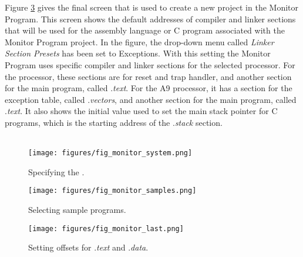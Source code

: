 Figure \ref{fig:monitor_last} gives the final screen that is 
used to create a new project in the Monitor Program. This screen shows the default addresses of 
compiler and linker sections that will be used for the assembly language or C program 
associated with the Monitor Program project.  In the figure, the drop-down menu called 
{\it Linker Section Presets} has been set to {\sf Exceptions}. With this setting the 
Monitor Program uses specific compiler and linker sections for the selected processor.
For the \processor processor, these sections are for reset and
trap handler, and another section for the main program, called .{\it text}. For the
A9 processor, it has a section for the exception table, 
called .{\it vectors}, and another section
for the main program, called .{\it text}. It also shows the initial value used to set the main 
stack pointer for C programs, which is the starting address of the .{\it stack} section.
~\\
~\\
\begin{figure}[h!]
	\centering
	\texttt{[image: figures/fig\_monitor\_system.png]}
	\caption{Specifying the {\systemNameFull}.}
	\label{fig:monitor_system}
\end{figure}

\begin{figure}[h!]
	\centering
	\texttt{[image: figures/fig\_monitor\_samples.png]}
	\caption{Selecting sample programs.}
	\label{fig:monitor_samples}
\end{figure}

\begin{figure}[h!]
\centering
	\texttt{[image: figures/fig\_monitor\_last.png]}
	\caption{Setting offsets for .{\it text} and .{\it data}.}
	\label{fig:monitor_last}
\end{figure}

